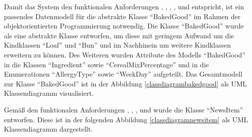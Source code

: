 
Damit das System den funktionalen Anforderungen , , , ,  und  entspricht, ist ein passendes Datenmodell für die abstrakte Klasse \enquote{BakedGood} im Rahmen der objektorientierten Programmierung notwendig. Die Klasse \enquote{BakedGood} wurde als eine abstrakte Klasse  entworfen, um diese mit geringem Aufwand um die Kindklassen \enquote{Loaf} und \enquote{Bun} und im Nachhinein um weitere Kindklassen erweitern zu können. Des Weiteren wurden Attribute des Modells \enquote{BakedGood} in die Klassen \enquote{Ingredient} sowie \enquote{CerealMixPercentage} und in die Enumerationen \enquote{AllergyType} sowie \enquote{WeekDay} aufgeteilt. Das  Gesamtmodell zur Klasse \enquote{BakedGood} ist in der Abbildung \ref{classdiagrambakedgood} als UML Klassendiagramm visualisiert.



\newpage

Gemäß den funktionalen Anforderungen , , , und  wurde die Klasse \enquote{NewsItem} entworfen. Diese ist in der folgenden Abbildung \ref{classdiagramnewsitem} als UML Klassendiagramm dargestellt.


\clearpage

